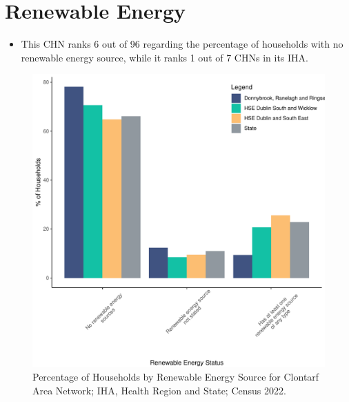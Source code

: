 \documentclass{article}
\begin{document}
\section{Renewable Energy}\label{sect:RE}
\begin{itemize}
\item This CHN ranks  6 out of 96 regarding the percentage of households with no renewable energy source, while it ranks   1 out of 7 CHNs in its IHA.
\end{itemize}
\begin{figure}[H]
	\centering
	\includegraphics[width = 140mm]{../figures/RenewableEnergyED.pdf}
	\caption{Percentage of Households by Renewable Energy Source for Clontarf Area Network; IHA, Health Region and State; Census 2022.}
	\label{fig:vbnv}
	\end{figure}
\end{document}
